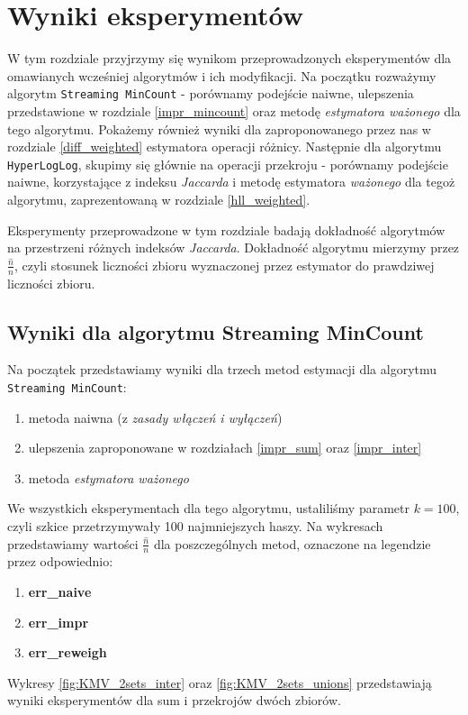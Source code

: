 \chapter{Wyniki eksperymentów}
\thispagestyle{chapterBeginStyle}

W tym rozdziale przyjrzymy się wynikom przeprowadzonych eksperymentów dla omawianych wcześniej algorytmów i ich modyfikacji. Na początku rozważymy algorytm \texttt{Streaming MinCount} - porównamy podejście naiwne, ulepszenia przedstawione w rozdziale \ref{impr_mincount} oraz metodę \textit{estymatora ważonego} dla tego algorytmu. Pokażemy również wyniki dla zaproponowanego przez nas w rozdziale \ref{diff_weighted} estymatora operacji różnicy. Następnie dla algorytmu \texttt{HyperLogLog}, skupimy się głównie na operacji przekroju - porównamy podejście naiwne, korzystające z indeksu \textit{Jaccarda} i metodę estymatora \textit{ważonego} dla tegoż algorytmu, zaprezentowaną w rozdziale \ref{hll_weighted}. %

Eksperymenty przeprowadzone w tym rozdziale badają dokładność algorytmów na przestrzeni różnych indeksów \textit{Jaccarda}. Dokładność algorytmu mierzymy przez $\frac{\hat{n}}{n}$, czyli stosunek liczności zbioru wyznaczonej przez estymator do prawdziwej liczności zbioru.

\section{Wyniki dla algorytmu Streaming MinCount}
Na początek przedstawiamy wyniki dla trzech metod estymacji dla algorytmu \texttt{Streaming MinCount}:
\begin{enumerate}
	\item metoda naiwna (z \textit{zasady włączeń i wyłączeń})
	\item ulepszenia zaproponowane w rozdziałach \ref{impr_sum} oraz \ref{impr_inter}
	\item metoda \textit{estymatora ważonego}
\end{enumerate}
We wszystkich eksperymentach dla tego algorytmu, ustaliliśmy parametr $k = 100$, czyli szkice przetrzymywały 100 najmniejszych haszy.
Na wykresach przedstawiamy wartości $\frac{\hat{n}}{n}$ dla poszczególnych metod, oznaczone na legendzie przez odpowiednio:
\begin{enumerate}
	\item \textbf{err\_naive}
	\item \textbf{err\_impr}
	\item \textbf{err\_reweigh}
\end{enumerate}
Wykresy \ref{fig:KMV_2sets_inter} oraz \ref{fig:KMV_2sets_unions} przedstawiają wyniki eksperymentów dla sum i przekrojów dwóch zbiorów.


